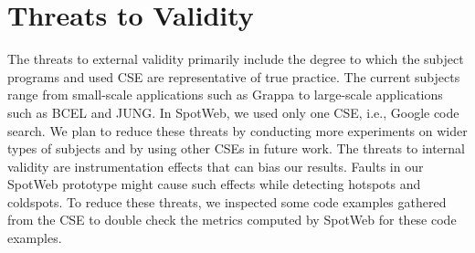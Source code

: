 
\section{Threats to Validity}
\label{sec:threats}
The threats to external validity primarily include the degree to
which the subject programs and used CSE are representative of true
practice. The current subjects range from small-scale applications
such as Grappa to large-scale applications such as BCEL and JUNG. In
SpotWeb, we used only one CSE, i.e., Google code search. We plan to
reduce these threats by conducting more experiments on wider types
of subjects and by using other CSEs in future work. The threats to
internal validity are instrumentation effects that can bias our
results. Faults in our SpotWeb prototype might cause such effects
while detecting hotspots and coldspots. To reduce these threats, we
inspected some code examples gathered from the CSE to double check
the metrics computed by SpotWeb for these code examples.

